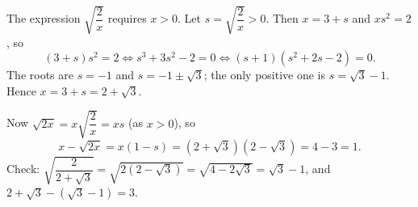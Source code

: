 The expression $\sqrt{\dfrac{2}{x}}$ requires $x>0$. Let $s=\sqrt{\dfrac{2}{x}}>0$. Then $x=3+s$ and $xs^2=2$, so
\[
(3+s)s^2=2\iff s^3+3s^2-2=0\iff(s+1)\left(s^2+2s-2\right)=0 .
\]
The roots are $s=-1$ and $s=-1\pm\sqrt3$; the only positive one is $s=\sqrt3-1$. Hence $x=3+s=2+\sqrt3$.

Now $\sqrt{2x}=x\sqrt{\dfrac{2}{x}}=xs$ (as $x>0$), so
\[
x-\sqrt{2x}=x(1-s)=\left(2+\sqrt3\right)\left(2-\sqrt3\right)=4-3=\boxed{1}.
\]
Check: $\sqrt{\dfrac{2}{2+\sqrt3}}=\sqrt{2\left(2-\sqrt3\right)}=\sqrt{4-2\sqrt3}=\sqrt3-1$, and $2+\sqrt3-\left(\sqrt3-1\right)=3$.
